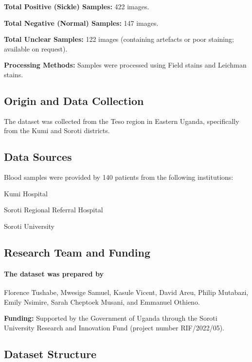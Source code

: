 \noindent\textbf{Total Positive (Sickle) Samples:} 422 images.

\noindent\textbf{Total Negative (Normal) Samples:} 147 images.

\noindent\textbf{Total Unclear Samples:} 122 images (containing artefacts or poor staining; available on request).

\noindent\textbf{Processing Methods:} Samples were processed using Field stains and Leichman stains.

\subsection{Origin and Data Collection}

The dataset was collected from the Teso region in Eastern Uganda, specifically from the Kumi and Soroti districts.

\subsection{Data Sources}

Blood samples were provided by 140 patients from the following institutions:

Kumi Hospital

Soroti Regional Referral Hospital

Soroti University

\subsection{Research Team and Funding}

\paragraph{The dataset was prepared by}

Florence Tushabe, Mwesige Samuel, Kasule Vicent, David Areu, Philip Mutabazi, Emily Nsimire, Sarah Cheptoek Musani, and Emmanuel Othieno.

\noindent\textbf{Funding:} Supported by the Government of Uganda through the Soroti University Research and Innovation Fund (project number RIF/2022/05).

\subsection{Dataset Structure}

